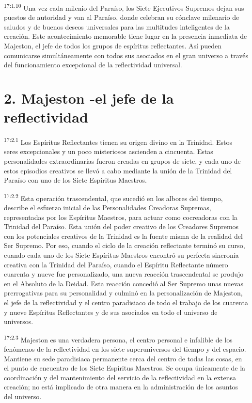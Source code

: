 \par
\textsuperscript{17:1.10} Una vez cada milenio del Paraíso, los Siete Ejecutivos Supremos dejan sus puestos de autoridad y van al Paraíso, donde celebran su cónclave milenario de saludos y de buenos deseos universales para las multitudes inteligentes de la creación. Este acontecimiento memorable tiene lugar en la presencia inmediata de Majeston, el jefe de todos los grupos de espíritus reflectantes. Así pueden comunicarse simultáneamente con todos sus asociados en el gran universo a través del funcionamiento excepcional de la reflectividad universal.

\section*{2. Majeston -el jefe de la reflectividad}
\par
\textsuperscript{17:2.1} Los Espíritus Reflectantes tienen su origen divino en la Trinidad. Estos seres excepcionales y un poco misteriosos ascienden a cincuenta. Estas personalidades extraordinarias fueron creadas en grupos de siete, y cada uno de estos episodios creativos se llevó a cabo mediante la unión de la Trinidad del Paraíso con uno de los Siete Espíritus Maestros.

\par
\textsuperscript{17:2.2} Esta operación trascendental, que sucedió en los albores del tiempo, describe el esfuerzo inicial de las Personalidades Creadoras Supremas, representadas por los Espíritus Maestros, para actuar como cocreadoras con la Trinidad del Paraíso. Esta unión del poder creativo de los Creadores Supremos con los potenciales creativos de la Trinidad es la fuente misma de la realidad del Ser Supremo. Por eso, cuando el ciclo de la creación reflectante terminó su curso, cuando cada uno de los Siete Espíritus Maestros encontró su perfecta sincronía creativa con la Trinidad del Paraíso, cuando el Espíritu Reflectante número cuarenta y nueve fue personalizado, una nueva reacción trascendental se produjo en el Absoluto de la Deidad. Esta reacción concedió al Ser Supremo unas nuevas prerrogativas para su personalidad y culminó en la personalización de Majeston, el jefe de la reflectividad y el centro paradisiaco de todo el trabajo de los cuarenta y nueve Espíritus Reflectantes y de sus asociados en todo el universo de universos.

\par
\textsuperscript{17:2.3} Majeston es una verdadera persona, el centro personal e infalible de los fenómenos de la reflectividad en los siete superuniversos del tiempo y del espacio. Mantiene su sede paradisiaca permanente cerca del centro de todas las cosas, en el punto de encuentro de los Siete Espíritus Maestros. Se ocupa únicamente de la coordinación y del mantenimiento del servicio de la reflectividad en la extensa creación; no está implicado de otra manera en la administración de los asuntos del universo.

